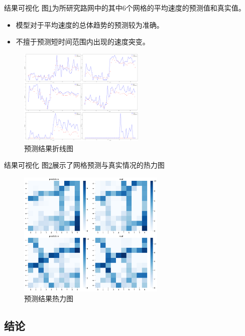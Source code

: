 \documentclass[10pt]{beamer}
\begin{document}
\begin{frame}{结果可视化}
    图\ref{tab.lineGraph}为所研究路网中的其中6个网格的平均速度的预测值和真实值。
    \begin{itemize}
        \item 模型对于平均速度的\alert{总体趋势}的预测较为准确。
        \item 不擅于预测\alert{短时间范围内出现的速度突变}。
    \end{itemize}
    
    \begin{figure}
        \centering
        \includegraphics[width=6cm]{pic/3x2.png}
        \caption{预测结果折线图}
        \label{tab.lineGraph}
    \end{figure}
\end{frame}

\begin{frame}{结果可视化}
    图\ref{fig.heatmap}展示了网格预测与真实情况的热力图
    \begin{figure}
        \centering
        \includegraphics[width=7cm]{pic/output.png}
        \caption{预测结果热力图}
        \label{fig.heatmap}
    \end{figure}
\end{frame}


\subsection{结论}
\end{document}
